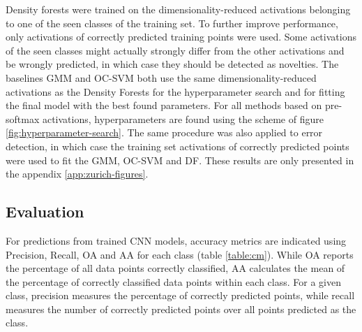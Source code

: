 \documentclass[10pt]{article}
\begin{document}
Density forests were trained on the dimensionality-reduced activations belonging to one of the seen classes of the training set. To further improve performance, only activations of correctly predicted training points were used. Some activations of the seen classes might actually strongly differ from the other activations and be wrongly predicted, in which case they should be detected as novelties. The baselines \gls{GMM} and \gls{OC-SVM} both use the same dimensionality-reduced activations as the Density Forests for the hyperparameter search and for fitting the final model with the best found parameters. For all methods based on pre-softmax activations, hyperparameters are found using the scheme of figure \ref{fig:hyperparameter-search}. The same procedure was also applied to error detection, in which case the training set activations of correctly predicted points were used to fit the \gls{GMM}, \gls{OC-SVM} and \acrlong{DF}. These results are only presented in the appendix \ref{app:zurich-figures}.


\subsection{Evaluation}
For predictions from trained \gls{CNN} models, accuracy metrics are indicated using Precision, Recall, \gls{OA} and \gls{AA} for each class (table \ref{table:cm}). While \gls{OA} reports the percentage of all data points correctly classified, \gls{AA} calculates the mean of the percentage of correctly classified data points within each class. For a given class, precision measures the percentage of correctly predicted points, while recall measures the number of correctly predicted points over all points predicted as the class. 
\end{document}

